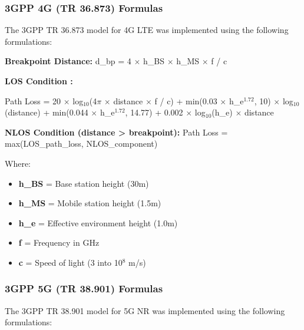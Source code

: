 \documentclass[MScCS]{uccthesis}
\begin{document}
   \subsubsection{3GPP 4G (TR 36.873) Formulas}
The 3GPP TR 36.873 model for 4G LTE was implemented using the following formulations:

\textbf{Breakpoint Distance:} d\_bp = 4 $\times$ h\_BS $\times$ h\_MS $\times$ f / c

\textbf{LOS Condition :}

Path Loss = 20 $\times$ log$_{10}$(4$\pi$ $\times$ distance $\times$ f / c) + min(0.03 $\times$ h\_e$^{1.72}$, 10) $\times$ log$_{10}$(distance) + min(0.044 $\times$ h\_e$^{1.72}$, 14.77) + 0.002 $\times$ log$_{10}$(h\_e) $\times$ distance

\textbf{NLOS Condition (distance > breakpoint):}
Path Loss = max(LOS\_path\_loss, NLOS\_component)

Where:
\begin{itemize}
\item \textbf{h\_BS} = Base station height (30m)
\item \textbf{h\_MS} = Mobile station height (1.5m)
\item \textbf{h\_e} = Effective environment height (1.0m)
\item \textbf{f} = Frequency in GHz
\item \textbf{c} = Speed of light (3 into 10$^8$ m/s)
\end{itemize}

\begin{center}
\end{center}

\subsubsection{3GPP 5G (TR 38.901) Formulas}
The 3GPP TR 38.901 model for 5G NR was implemented using the following formulations:
\end{document}
